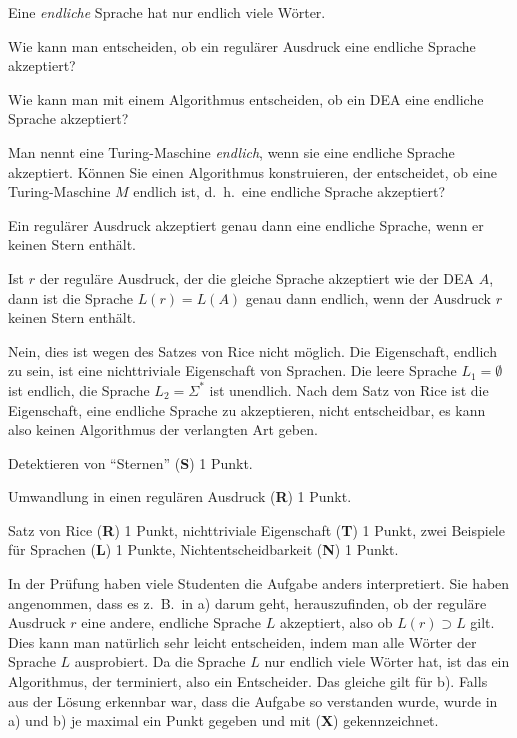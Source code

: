 Eine {\em endliche} Sprache hat nur endlich viele Wörter.
\begin{teilaufgaben}
\item
Wie kann man entscheiden, ob ein regulärer Ausdruck eine endliche
Sprache akzeptiert?
\item
Wie kann man mit einem Algorithmus entscheiden, ob ein DEA
eine endliche Sprache akzeptiert?
\item
Man nennt eine Turing-Maschine {\em endlich}, wenn sie eine endliche
Sprache akzeptiert.
Können Sie einen Algorithmus konstruieren, der entscheidet, ob eine
Turing-Maschine $M$ endlich ist, d.~h.~eine endliche Sprache akzeptiert?
\end{teilaufgaben}


\begin{loesung}
\begin{teilaufgaben}
\item
Ein regulärer Ausdruck akzeptiert genau dann eine endliche Sprache, 
wenn er keinen Stern enthält.
\item
Ist $r$ der reguläre Ausdruck, der die gleiche Sprache akzeptiert
wie der DEA $A$, dann ist die Sprache $L(r)=L(A)$ genau dann endlich,
wenn der Ausdruck $r$ keinen Stern enthält.
\item
Nein, dies ist wegen des Satzes von Rice nicht möglich.
Die Eigenschaft, endlich zu sein, ist eine nichttriviale Eigenschaft
von Sprachen.
Die leere Sprache $L_1=\emptyset$ ist endlich, die Sprache $L_2=\Sigma^*$
ist unendlich.
Nach dem Satz von Rice ist die Eigenschaft, eine endliche Sprache zu
akzeptieren, nicht entscheidbar, es kann also keinen Algorithmus der
verlangten Art geben.
\qedhere
\end{teilaufgaben}
\end{loesung}

\begin{bewertung}
\begin{teilaufgaben}
\item
Detektieren von ``Sternen'' ({\bf S}) 1 Punkt.
\item
Umwandlung in einen regulären Ausdruck ({\bf R}) 1 Punkt.
\item
Satz von Rice ({\bf R}) 1 Punkt,
nichttriviale Eigenschaft ({\bf T}) 1 Punkt,
zwei Beispiele für Sprachen ({\bf L}) 1 Punkte,
Nichtentscheidbarkeit ({\bf N}) 1 Punkt.
\end{teilaufgaben}
In der Prüfung haben viele Studenten die Aufgabe anders interpretiert.
Sie haben angenommen, dass es z.~B.~in a) darum geht, herauszufinden,
ob der reguläre Ausdruck $r$ eine andere, endliche Sprache $L$ akzeptiert,
also ob $L(r) \supset L$ gilt.
Dies kann man natürlich sehr leicht entscheiden, indem man alle Wörter
der Sprache $L$ ausprobiert.
Da die Sprache $L$ nur endlich viele Wörter hat, ist das ein
Algorithmus, der terminiert, also ein Entscheider.
Das gleiche gilt für b).
Falls aus der Lösung erkennbar war, dass die Aufgabe so verstanden wurde,
wurde in a) und b) je maximal ein Punkt gegeben und mit ({\bf X})
gekennzeichnet.
\end{bewertung}
